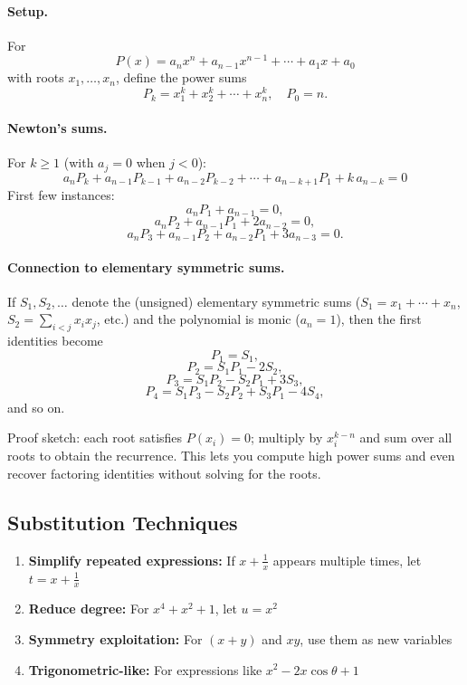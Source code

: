 \documentclass[12pt]{extarticle}
\begin{document}
\paragraph{Setup.} For
\[
P(x) = a_n x^n + a_{n-1}x^{n-1} + \cdots + a_1x + a_0
\]
with roots $x_1,\dots,x_n$, define the power sums
\[
P_k = x_1^k + x_2^k + \cdots + x_n^k,\quad P_0 = n.
\]

\paragraph{Newton's sums.} For $k \ge 1$ (with $a_j = 0$ when $j < 0$):
\[
\boxed{a_n P_k + a_{n-1}P_{k-1} + a_{n-2}P_{k-2} + \cdots + a_{n-k+1}P_1 + k\,a_{n-k} = 0}
\]
First few instances:
\[
a_n P_1 + a_{n-1} = 0,
\]
\[
a_n P_2 + a_{n-1}P_1 + 2a_{n-2} = 0,
\]
\[
a_n P_3 + a_{n-1}P_2 + a_{n-2}P_1 + 3a_{n-3} = 0.
\]

\paragraph{Connection to elementary symmetric sums.} If $S_1, S_2, \dots$ denote the (unsigned) elementary symmetric sums ($S_1 = x_1 + \cdots + x_n$, $S_2 = \sum_{i<j} x_i x_j$, etc.) and the polynomial is monic ($a_n = 1$), then the first identities become
\[
P_1 = S_1,
\]
\[
P_2 = S_1 P_1 - 2S_2,
\]
\[
P_3 = S_1 P_2 - S_2 P_1 + 3S_3,
\]
\[
P_4 = S_1 P_3 - S_2 P_2 + S_3 P_1 - 4S_4,
\]
and so on.

\begin{remarkbox}
Proof sketch: each root satisfies $P(x_i) = 0$; multiply by $x_i^{k-n}$ and sum over all roots to obtain the recurrence. This lets you compute high power sums and even recover factoring identities without solving for the roots.
\end{remarkbox}

\subsection{Substitution Techniques}

\begin{conceptbox}
\begin{enumerate}
    \item \textbf{Simplify repeated expressions:} If $x + \frac{1}{x}$ appears multiple times, let $t = x + \frac{1}{x}$
    \item \textbf{Reduce degree:} For $x^4 + x^2 + 1$, let $u = x^2$
    \item \textbf{Symmetry exploitation:} For $(x+y)$ and $xy$, use them as new variables
    \item \textbf{Trigonometric-like:} For expressions like $x^2 - 2x\cos\theta + 1$
\end{enumerate}
\end{conceptbox}
\end{document}
